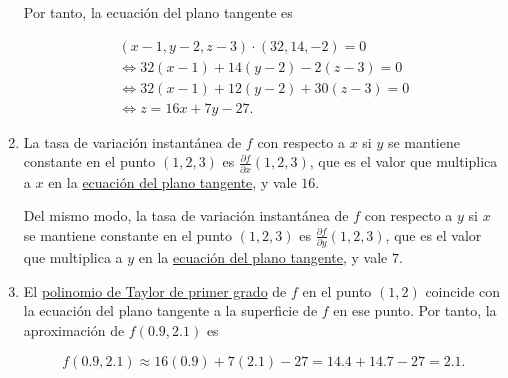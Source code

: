 \documentclass[
  a4paper,
]{scrreport}
\theoremstyle{definition}
\theoremstyle{remark}
\begin{document}
\begin{tcolorbox}
\begin{enumerate}
  Por tanto, la ecuación del plano tangente es

  \[
  \begin{gathered}
  (x-1, y-2, z-3) \cdot (32, 14, -2) = 0 \\
  \Leftrightarrow 32(x-1) + 14(y-2) - 2(z-3) = 0 \\
  \Leftrightarrow 32(x-1) + 12(y-2) + 30(z-3) = 0 \\
  \Leftrightarrow z = 16x + 7y - 27.
  \end{gathered}
  \]
\item
  La tasa de variación instantánea de \(f\) con respecto a \(x\) si
  \(y\) se mantiene constante en el punto \((1,2,3)\) es
  \(\frac{\partial f}{\partial x}(1,2,3)\), que es el valor que
  multiplica a \(x\) en la
  \href{https://aprendeconalf.es/analisis-manual/13-derivadas-funciones-varias-variables.html\#def-plano-tangente-superficie}{ecuación
  del plano tangente}, y vale \(16\).

  Del mismo modo, la tasa de variación instantánea de \(f\) con respecto
  a \(y\) si \(x\) se mantiene constante en el punto \((1,2,3)\) es
  \(\frac{\partial f}{\partial y}(1,2,3)\), que es el valor que
  multiplica a \(y\) en la
  \href{https://aprendeconalf.es/analisis-manual/13-derivadas-funciones-varias-variables.html\#def-plano-tangente-superficie}{ecuación
  del plano tangente}, y vale \(7\).
\item
  El
  \href{https://aprendeconalf.es/analisis-manual/13-derivadas-funciones-varias-variables.html\#aproximaci\%C3\%B3n-lineal-de-una-funci\%C3\%B3n-de-varias-variables}{polinomio
  de Taylor de primer grado} de \(f\) en el punto \((1,2)\) coincide con
  la ecuación del plano tangente a la superficie de \(f\) en ese punto.
  Por tanto, la aproximación de \(f(0.9, 2.1)\) es

  \[
  f(0.9, 2.1) \approx 16(0.9) + 7(2.1) - 27 = 14.4 + 14.7 - 27 = 2.1.
  \]
\end{enumerate}

\end{tcolorbox}
\end{document}
